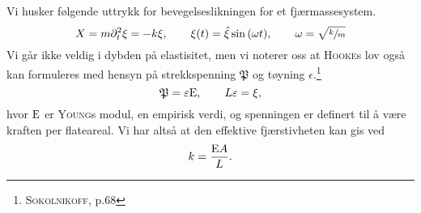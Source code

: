 Vi husker følgende uttrykk for bevegelseslikningen for et fjærmassesystem.
\[
X = m\partial_t^2 \xi = -k\xi, \qquad \xi(t) = \hat{\xi}\sin{(\omega t)}, \qquad \omega = \sqrt{\sfrac{k}{m}}
\]
Vi går ikke veldig i dybden på elastisitet, men vi noterer oss at \textsc{Hooke}s lov også kan formuleres med hensyn på strekkspenning $\mathfrak{P}$ og tøyning $\epsilon$.\footnote{\cite{sokolnikoff1956mathematical} \textsc{Sokolnikoff}, p.68}
\[
\mathfrak{P} = \varepsilon\mathrm{E}, \qquad L\varepsilon = \xi,
\]
hvor $\mathrm{E}$ er \textsc{Young}s modul, en empirisk verdi, og spenningen er definert til å være kraften per flateareal.
Vi har altså at den effektive fjærstivheten kan gis ved
\[
k = \frac{\mathrm{E} A}{L}.
\]
